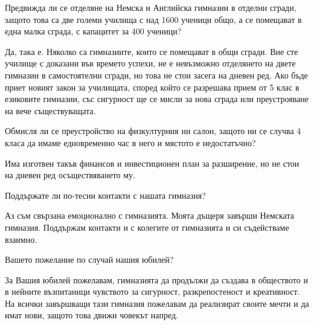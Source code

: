 \begin{multicols}{3}
Предвижда ли се отделяне на Немска и Английска гимназии в отделни сгради, защото 
това са две големи училища с над 1600 ученици общо, а се помещават в една малка 
сграда, с капацитет за 400 ученици?  

Да, така е. Няколко са гимназиите, които се помещават в общи сгради. Вие сте 
училище с доказани във времето успехи, не е невъзможно отделянето на двете 
гимназии в самостоятелни сгради, но това не стои засега на дневен ред. Ако бъде 
приет новият закон за училищата, според който се разрешава прием от 5 клас  в 
езиковите гимназии, със сигурност ще се мисли  за нова сграда или преустрояване 
на вече съществуващата.

Обмисля ли се преустройство на физкултурния ни салон, защото ни се случва 4 
класа да имаме едновременно час в него и мястото е недостатъчно?

Има изготвен такъв финансов и инвестиционен план за разширение, но не стои на 
дневен ред осъществяването му. 

Поддържате ли по-тесни контакти с нашата гимназия?

Аз съм свързана емоционално с гимназията. Моята дъщеря завърши Немската 
гимназия. Поддържам контакти и с колегите от гимназията и си съдействаме 
взаимно.

Вашето пожелание по случай нашия юбилей?

За Вашия юбилей пожелавам, гимназията да продължи да създава в обществото и в 
нейните възпитаници чувството за сигурност, разкрепостеност и креативност. На 
всички завършващи тази гимназия пожелавам да реализират своите мечти и да имат 
нови, защото това движи човекът напред.
\closearticle
\end{multicols}
